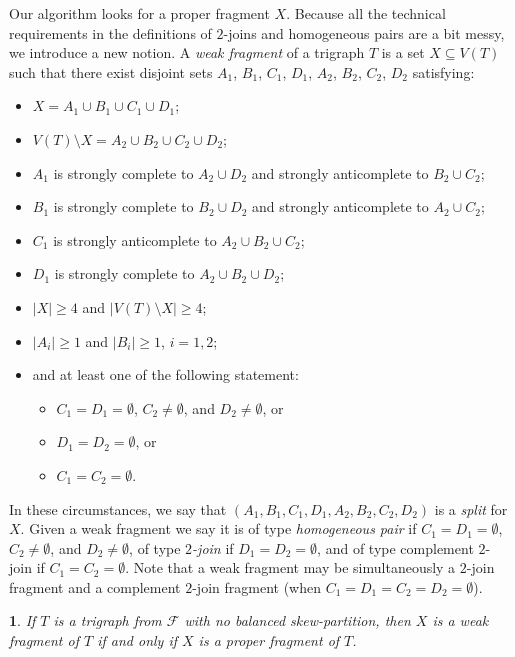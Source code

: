 \documentclass[11 pt] {article}
\newtheorem{theorem}{}[section]
\begin{document}
Our algorithm looks for a proper fragment $X$.  Because all the
technical requirements in the definitions of $2$-joins and homogeneous
pairs are a bit messy, we introduce a new notion.  A \emph{weak
  fragment} of a trigraph $T$ is a set $X\subseteq V(T)$ such that
there exist disjoint sets $A_1$, $B_1$, $C_1$, $D_1$, $A_2$, $B_2$,
$C_2$, $D_2$ satisfying:

\begin{itemize}
\item $X = A_1 \cup B_1 \cup C_1 \cup D_1$;
\item  $V(T) \setminus X= A_2 \cup B_2 \cup C_2 \cup D_2$;
\item $A_1$ is strongly complete to $A_{2} \cup D_{2}$ and strongly
  anticomplete to $B_2 \cup C_2$;
\item $B_1$ is strongly complete to $B_{2}\cup D_{2}$ and strongly
 anticomplete to $A_2 \cup C_2$;
\item $C_1$ is strongly anticomplete to $A_2 \cup B_{2}\cup C_{2}$;
\item $D_1$ is strongly complete to $A_{2}\cup B_{2}\cup D_{2}$;
\item $|X|\geq 4$ and $|V(T) \setminus X| \geq 4$;
\item $|A_i| \geq 1$ and $|B_i| \geq 1$, $i=1, 2$;
\item and at least one of the following statement:

\begin{itemize}
\item $C_1=D_1 = \emptyset$, $C_2 \neq \emptyset$, and $D_2 \neq \emptyset$,  or
\item $D_1=D_2=\emptyset$, or
\item $C_1=C_2 = \emptyset$.
\end{itemize}
\end{itemize}


In these circumstances, we say that $(A_1, B_1, C_1, D_1, A_2, B_2,
C_2, D_2)$ is a \emph{split} for $X$.
Given a weak fragment we say it is of type {\em homogeneous pair}
if $C_1=D_1=\emptyset$, $C_2 \neq \emptyset$, and $D_2 \neq \emptyset$, of 
type {\em $2$-join} if $D_1=D_2=\emptyset$, and
of type {complement $2$-join} if $C_1=C_2=\emptyset$. 
Note that a weak fragment may be simultaneously a $2$-join fragment and
a complement $2$-join fragment (when $C_1 = D_1 = C_2 = D_2 =
\emptyset$). 

\begin{theorem}
\label{weakstruct}
If $T$ is a trigraph from $\mathcal{F}$ with no balanced
skew-partition, then $X$ is a weak fragment of $T$ if and only if $X$
is a proper fragment of $T$.
\end{theorem}
\end{document}
